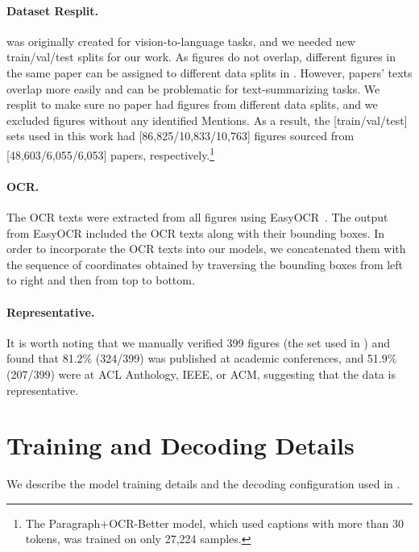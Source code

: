 \paragraph{Dataset Resplit.}
\oldDataset was originally created for vision-to-lan\-guage tasks, and
we needed new train/val/test splits for our work. %
As figures do not overlap, different figures in the same paper can be assigned to different data splits in \oldDataset.
However, papers' texts overlap more easily and can be problematic for text-summarizing tasks. 
We resplit \oldDataset to make sure no paper had figures from different data splits, 
and we excluded figures without any identified Mentions. 
As a result, the [train/val/test] sets used in this work had [86,825/10,833/10,763] figures 
sourced from [48,603/6,055/6,053] papers, respectively.\footnote{The Paragraph+OCR-Better model, which used captions with more than 30 tokens, was trained on only 27,224 samples.}

\paragraph{OCR.}
The OCR texts were extracted from all figures using EasyOCR~\cite{easyocr}.
The output from EasyOCR included the OCR texts along with their bounding boxes.
In order to incorporate the OCR texts into our models, we concatenated them with the sequence of coordinates obtained by traversing the bounding boxes from left to right and then from top to bottom.

\paragraph{Representative.}
It is worth noting that we manually verified 399 figures (the set used in ) and found that 81.2\% (324/399) was published at academic conferences, and 51.9\% (207/399) were at ACL Anthology, IEEE, or ACM, suggesting that the data is representative.





\section{Training and Decoding Details}
\label{sec:appendix-model-training-details}
We describe the model training details and the decoding configuration used in .

